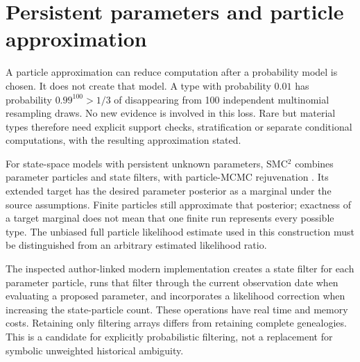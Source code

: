 
\section{Persistent parameters and particle approximation}
A particle approximation can reduce computation after a probability model is
chosen. It does not create that model. A type with probability $0.01$ has
probability $0.99^{100}>1/3$ of disappearing from 100 independent multinomial
resampling draws. No new evidence is involved in this loss. Rare but material
types therefore need explicit support checks, stratification or separate
conditional computations, with the resulting approximation stated.

For state-space models with persistent unknown parameters, SMC$^2$ combines
parameter particles and state filters, with particle-MCMC rejuvenation
\cite[Section~3.2, equation~(7), Proposition~1, Appendix~A]{litclosesmc2}. Its
extended target has the desired parameter posterior as a marginal under the
source assumptions. Finite particles still approximate that posterior; exactness
of a target marginal does not mean that one finite run represents every
possible type. The unbiased full particle likelihood estimate used in this
construction must be distinguished from an arbitrary estimated likelihood
ratio.

The inspected author-linked modern implementation creates a state filter for
each parameter particle, runs that filter through the current observation date
when evaluating a proposed parameter, and incorporates a likelihood correction
when increasing the state-particle count. These operations have real time and
memory costs. Retaining only filtering arrays differs from retaining complete
genealogies. This is a candidate for explicitly probabilistic filtering, not
a replacement for symbolic unweighted historical ambiguity.
